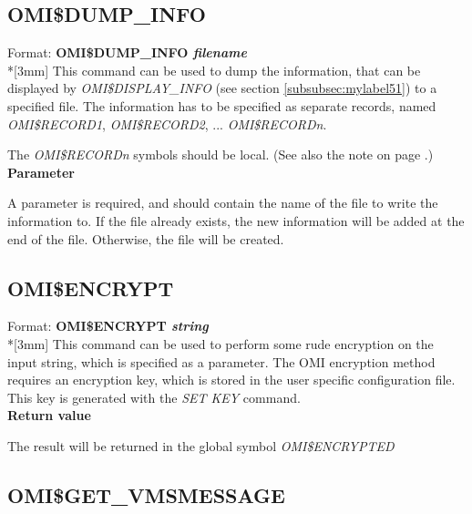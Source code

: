 \documentclass[a4paper]{book}
\renewcommand{\indent}{\hspace*{5mm}}
\begin{document}
\subsection{OMI{\$}DUMP{\_}INFO}
\label{subsubsec:mylabel53}

\indent Format: \textbf{OMI{\$}DUMP{\_}INFO \textit{filename}}\\*[3mm]
This command can be used to dump the information, that can be displayed by 
\textsl{OMI{\$}DISPLAY{\_}INFO} (see section \ref{subsubsec:mylabel51}) to a 
specified file. The information has to be specified as separate records, 
named \textsl{OMI{\$}RECORD1}, \textsl{OMI{\$}RECORD2}, ... \textsl{OMI{\$}RECORD\textit{n}}.

The \textsl{OMI{\$}RECORD\textit{n}} symbols should be local.
(See also the note on page \pageref{note:dispinfo}.)\\[3mm]
\textbf{Parameter}

\noindent A parameter is required, and should contain the name of the file to write 
the information to. If the file already exists, the new information will be 
added at the end of the file. Otherwise, the file will be created.


\subsection{OMI{\$}ENCRYPT}
\label{subsubsec:mylabel54}

\indent Format: \textbf{OMI{\$}ENCRYPT \textit{string}}\\*[3mm]
This command can be used to perform some rude encryption on the input 
string, which is specified as a parameter. The OMI encryption method 
requires an encryption key, which is stored in the user specific 
configuration file. This key is generated with the \textsl{SET KEY} command.\\[3mm]
\textbf{Return value}

\noindent The result will be returned in the global symbol \textsl{OMI{\$}ENCRYPTED}

\subsection{OMI{\$}GET{\_}VMSMESSAGE}
\label{subsubsec:mylabel55}
\end{document}
